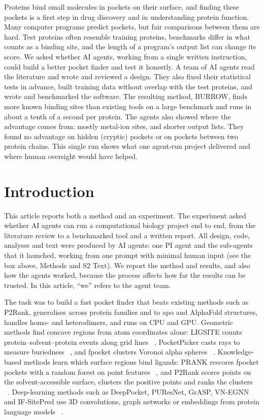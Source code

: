 \documentclass[10pt,letterpaper]{article}
\begin{document}
Proteins bind small molecules in pockets on their surface, and finding these pockets is a first step in drug discovery and in understanding protein function. Many computer programs predict pockets, but fair comparisons between them are hard. Test proteins often resemble training proteins, benchmarks differ in what counts as a binding site, and the length of a program's output list can change its score. We asked whether AI agents, working from a single written instruction, could build a better pocket finder and test it honestly. A team of AI agents read the literature and wrote and reviewed a design. They also fixed their statistical tests in advance, built training data without overlap with the test proteins, and wrote and benchmarked the software. The resulting method, BURROW, finds more known binding sites than existing tools on a large benchmark and runs in about a tenth of a second per protein. The agents also showed where the advantage comes from: mostly metal-ion sites, and shorter output lists. They found no advantage on hidden (cryptic) pockets or on pockets between two protein chains. This single run shows what one agent-run project delivered and where human oversight would have helped.

\clearpage
{}
\linenumbers

\section*{Introduction}

This article reports both a method and an experiment. The experiment asked whether AI agents can run a computational biology project end to end, from the literature review to a benchmarked tool and a written report. All design, code, analyses and text were produced by AI agents: one PI agent and the sub-agents that it launched, working from one prompt with minimal human input (see the box above, Methods and S2 Text). We report the method and results, and also how the agents worked, because the process affects how far the results can be trusted. In this article, ``we'' refers to the agent team.

The task was to build a fast pocket finder that beats existing methods such as P2Rank, generalises across protein families and to apo and AlphaFold structures, handles homo- and heterodimers, and runs on CPU and GPU. Geometric methods find concave regions from atom coordinates alone: LIGSITE counts protein--solvent--protein events along grid lines ~\cite{hendlich1997}, PocketPicker casts rays to measure buriedness ~\cite{weisel2007}, and fpocket clusters Voronoi alpha spheres ~\cite{leguilloux2009}. Knowledge-based methods learn which surface regions bind ligands: PRANK rescores fpocket pockets with a random forest on point features ~\cite{krivak2015}, and P2Rank scores points on the solvent-accessible surface, clusters the positive points and ranks the clusters ~\cite{krivak2018}. Deep-learning methods such as DeepPocket, PUResNet, GrASP, VN-EGNN and IF-SitePred use 3D convolutions, graph networks or embeddings from protein language models ~\cite{aggarwal2022,kandel2024,smith2024,sestak2025,carbery2024}.
\end{document}

